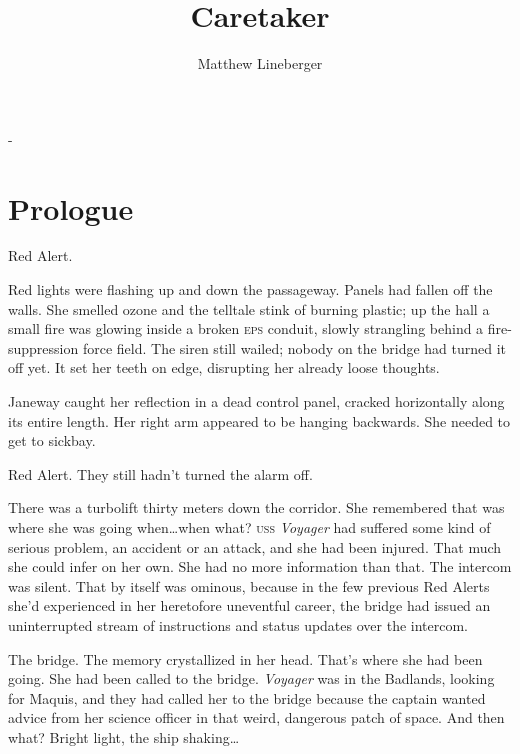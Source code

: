 \documentclass[twoside,letterpaper,12pt]{memoir}
\title{Caretaker}
\author{Matthew Lineberger}
\date
\begin{document}
\setmainfont[Ligatures=TeX, Contextuals=NoAlternate, Numbers=Lowercase]{Garamond Premier Pro}

\begin{titlingpage}
	\calccentering{\unitlength}
	\begin{adjustwidth*}{\unitlength}{-\unitlength}
	\maketitle 
	\end{adjustwidth*}
\end{titlingpage}

\pagestyle{simple}

\chapter*{Prologue}

\noindent Red Alert.

Red lights were flashing up and down the passageway. Panels had fallen off the walls. She smelled ozone and the telltale stink of burning plastic; up the hall a small fire was glowing inside a broken \textsc{eps} conduit, slowly strangling behind a fire-suppression force field. The siren still wailed; nobody on the bridge had turned it off yet. It set her teeth on edge, disrupting her already loose thoughts.

Janeway caught her reflection in a dead control panel, cracked horizontally along its entire length. Her right arm appeared to be hanging backwards. She needed to get to sickbay.

Red Alert. They still hadn't turned the alarm off.

There was a turbolift thirty meters down the corridor. She remembered that was where she was going when\ldots when what? \textsc{uss} \textit{Voyager} had suffered some kind of serious problem, an accident or an attack, and she had been injured. That much she could infer on her own. She had no more information than that. The intercom was silent. That by itself was ominous, because in the few previous Red Alerts she'd experienced in her heretofore uneventful career, the bridge had issued an uninterrupted stream of instructions and status updates over the intercom.

The bridge. The memory crystallized in her head. That's where she had been going. She had been called to the bridge. \textit{Voyager} was in the Badlands, looking for Maquis, and they had called her to the bridge because the captain wanted advice from her science officer in that weird, dangerous patch of space. And then what? Bright light, the ship shaking…
\end{document}
